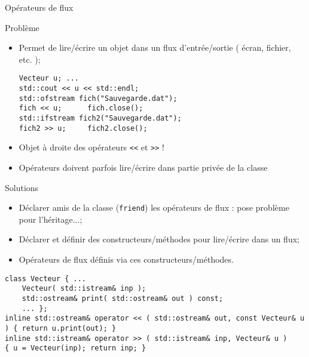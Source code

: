 \documentclass[handout,10pt]{beamer}
\begin{document}
\begin{frame}[fragile]{Opérateurs de flux}
\scriptsize
\begin{block}{Problème}
\begin{itemize}
\item Permet de lire/écrire un objet dans un flux d'entrée/sortie ( écran, fichier, etc. );
\begin{lstlisting}
Vecteur u; ...
std::cout << u << std::endl;
std::ofstream fich("Sauvegarde.dat");
fich << u;      fich.close();
std::ifstream fich2("Sauvegarde.dat");
fich2 >> u;     fich2.close();
\end{lstlisting}
\item Objet à droite des opérateurs \lstinline{<<} et \lstinline{>>} !
\item Opérateurs doivent parfois lire/écrire dans partie privée de la classe
\end{itemize}
\end{block}

\begin{block}{Solutions}
\begin{itemize}
\item Déclarer amis de la classe (\lstinline{friend}) les opérateurs de flux : pose problème pour l'héritage...;
\item Déclarer et définir des constructeurs/méthodes pour lire/écrire dans un flux;
\item Opérateurs de flux définis via ces constructeurs/méthodes.
\end{itemize}
\end{block}
\begin{lstlisting}
class Vecteur { ...
    Vecteur( std::istream& inp );
    std::ostream& print( std::ostream& out ) const;
    ... };    
inline std::ostream& operator << ( std::ostream& out, const Vecteur& u ) { return u.print(out); }
inline std::istream& operator >> ( std::istream& inp, Vecteur& u )
{ u = Vecteur(inp); return inp; }    
\end{lstlisting}
\end{frame}
\end{document}
